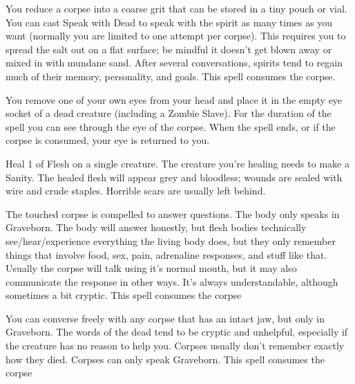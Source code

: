 {You reduce a corpse into a coarse grit that can be stored in a tiny pouch or vial. You can cast Speak with Dead to speak with the spirit as many times as you want (normally you are limited to one attempt per corpse). This requires you to spread the salt out on a flat surface; be mindful it doesn't get blown away or mixed in with mundane sand. After several conversations, spirits tend to regain much of their memory, personality, and goals. This spell consumes the corpse.

\NECRO[
  Name=Eyes of the Dead,
  Link=necromancy-eyes-of-the-dead,
  Paradigm=Death,
  Save=N,
  Duration=Session,
  Mod=+9,
  Keywords=None,
  Target=Close (touch) corpse
]


You remove one of your own eyes from your head and place it in the empty eye socket of a dead creature (including a Zombie Slave). For the duration of the spell you can see through the eye of the corpse.  When the spell ends, or if the corpse is consumed, your eye is returned to you.

\NECRO[
  Name=Knit Flesh,
  Link=necromancy-knit-flesh,
  Paradigm=Death,
  Save=N,
  Duration=0,
  Mod=+9,
  Keywords=None,
  Target=Close (touch) creature
]


Heal 1 \HD of Flesh on a single creature. The creature you're healing needs to make a \RS Sanity.  The healed flesh will appear grey and bloodless; wounds are sealed with wire and crude staples.  Horrible scars are usually left behind.


\NECRO[
  Name=Necrography,
  Link=necromancy-necrography,
  Paradigm=Death,
  Save=N,
  Duration=\LVL Minutes,
  Mod=+6,
  Keywords=None,
  Target=Close (touch) Mortal corpse
]

The touched corpse is compelled to answer \LVL questions.  The body only speaks in Graveborn. The body will answer honestly, but flesh bodies technically see/hear/experience everything the living body does, but they only remember things that involve food, sex, pain, adrenaline responses, and stuff like that. Usually the corpse will talk using it's normal mouth, but it may also communicate the response in other ways. It's always understandable, although sometimes a bit cryptic.  This spell consumes the corpse

\NECRO[
  Name=Speak with Dead,
  Link=necromancy-speak-with-dead,
  Paradigm=Death,
  Save=N,
  Duration=\LVL x2 Minutes,
  Mod=+3,
  Keywords=None,
  Target=Close (touch) Mortal corpse
]


You can converse freely with any corpse that has an intact jaw, but only in Graveborn. The words of the dead tend to be cryptic and unhelpful, especially if the creature has no reason to help you. Corpses usually don't remember exactly how they died. Corpses can only speak Graveborn.  This spell consumes the corpse

}
